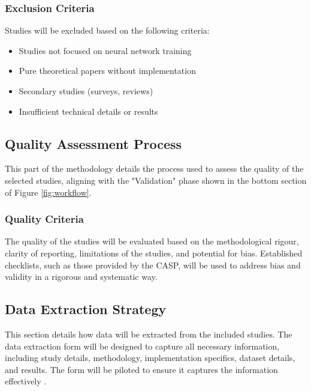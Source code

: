 \subsubsection{Exclusion Criteria}
Studies will be excluded based on the following criteria:
\begin{itemize}
	\item Studies not focused on neural network training
	\item Pure theoretical papers without implementation
	\item Secondary studies (surveys, reviews)
	\item Insufficient technical details or results
\end{itemize}

\subsection{Quality Assessment Process}
\label{sec:quality-assessment-process}
This part of the methodology details the process used to assess the quality of the selected studies, aligning with the "Validation" phase shown in the bottom section of Figure \ref{fig:workflow}.

\subsubsection{Quality Criteria}
The quality of the studies will be evaluated based on the methodological rigour, clarity of
reporting, limitations of the studies, and potential for bias. Established checklists, such as
those provided by the CASP, will be used to address bias and validity in a rigorous and systematic
way.

\subsection{Data Extraction Strategy}
\label{sec:data-extraction-strategy}
This section details how data will be extracted from the included studies. The data extraction form will be designed to capture all necessary information, including study details, methodology, implementation specifics, dataset details, and results. The form will be piloted to ensure it captures the information effectively \cite{ben-nun_demystifying_2020}.


